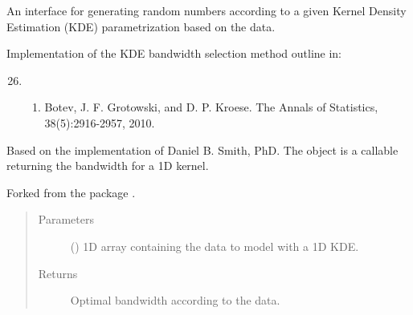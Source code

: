 \documentclass[letterpaper,10pt,english]{sphinxmanual}
\begin{document}

\begin{fulllineitems}
\label{\detokenize{api:brainSimulator.KDEestimator}}
An interface for generating random numbers according
to a given Kernel Density Estimation (KDE) parametrization based on the 
data.

\begin{fulllineitems}
\label{\detokenize{api:brainSimulator.KDEestimator.botev_bandwidth}}
Implementation of the KDE bandwidth selection method outline in:
\begin{enumerate}
\setcounter{enumi}{25}
\item {} \begin{enumerate}
\item {} 
Botev, J. F. Grotowski, and D. P. Kroese.  The Annals of Statistics, 38(5):2916-2957, 2010.

\end{enumerate}

\end{enumerate}

Based on the implementation of Daniel B. Smith, PhD. The object is a callable returning the bandwidth for a 1D kernel.

Forked from the package .
\begin{quote}\begin{description}
\item[{Parameters}] \leavevmode
{} () \textendash{} 1D array containing the data to model with a 1D KDE.

\item[{Returns}] \leavevmode
Optimal bandwidth according to the data.

\end{description}\end{quote}

\end{fulllineitems}


\end{fulllineitems}
\end{document}
